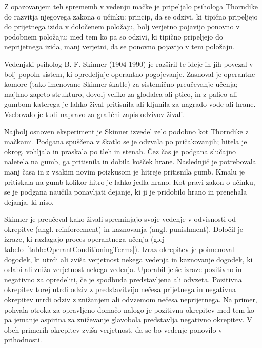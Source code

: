 \documentclass[a4paper, oneside, 12pt]{report}
\begin{document}

Z opazovanjem teh sprememb v vedenju mačke je pripeljalo psihologa Thorndike do razvitja njegovega zakona o učinku: princip, da se odzivi, ki tipično pripeljejo do prijetnega izida v določenem položaju, bolj verjetno pojavijo ponovno v podobnem položaju; med tem ko pa so odzivi, ki tipično pripeljejo do neprijetnega izida, manj verjetni, da se ponovno pojavijo v tem položaju.~\cite{AnimalIntelligence2}

Vedenjski psiholog B. F. Skinner (1904-1990) je razširil te ideje in jih povezal v bolj popoln sistem, ki opredeljuje operantno pogojevanje. Zasnoval je operantne komore (tako imenovane Skinner škatle) za sistemično preučevanje učenja; majhno zaprto strukturo, dovolj veliko za glodalca ali ptico, in z palico ali gumbom katerega je lahko žival pritisnila ali kljunila za nagrado vode ali hrane. Vsebovalo je tudi napravo za grafični zapis odzivov živali.~\cite{IntroductionToPsychology}


Najbolj osnoven eksperiment je Skinner izvedel zelo podobno kot Thorndike z mačkami. Podgana spuščena v škatlo se je odzvala po pričakovanjih; hitela je okrog, vohljala in praskala po tleh in stenah. Čez čas je podgana slučajno naletela na gumb, ga pritisnila in dobila košček hrane. Naslednjič je potrebovala manj časa in z vsakim novim poizkusom je hitreje pritisnila gumb. Kmalu je pritiskala na gumb kolikor hitro je lahko jedla hrano. Kot pravi zakon o učinku, se je podgana naučila ponavljati dejanje, ki ji je pridobilo hrano in prenehala dejanja, ki niso.~\cite{IntroductionToPsychology}

Skinner je preučeval kako živali spreminjajo svoje vedenje v odvisnosti od okrepitve (angl. reinforcement) in kaznovanja (angl. punishment). Določil je izraze, ki razlagajo proces operantnega učenja (glej tabelo~\ref{table:OperantConditioningTerms}). Izraz okrepitev je poimenoval dogodek, ki utrdi ali zviša verjetnost nekega vedenja in kaznovanje dogodek, ki oslabi ali zniža verjetnost nekega vedenja. Uporabil je še izraze pozitivno in negativno za opredeliti, če je spodbuda predstavljena ali odvzeta. Pozitivna okrepitev torej utrdi odziv z predstavitvijo nečesa prijetnega in negativna okrepitev utrdi odziv z znižanjem ali odvzemom nečesa neprijetnega. Na primer, pohvala otroka za opravljeno domačo nalogo je pozitivna okrepitev med tem ko pa jemanje aspirina za zniževanje glavobola predstavlja negativno okrepitev. V obeh primerih okrepitev zviša verjetnost, da se bo vedenje ponovilo v prihodnosti.~\cite{IntroductionToPsychology}
\end{document}
